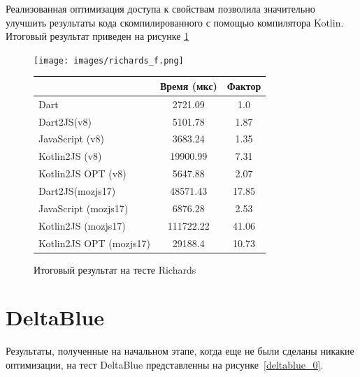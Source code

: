 Реализованная оптимизация доступа к свойствам позволила значительно улучшить результаты кода скомпилированного с помощью компилятора Kotlin. Итоговый результат приведен на рисунке \ref{richards_f}

\begin{figure}[ht!]
\centering
\begin{minipage}[t]{\linewidth}
\texttt{[image: images/richards\_f.png]}
\end{minipage}

\begin{minipage}[h]{\linewidth}
\centering
\begin{tabular}{|l|c|c|}
    \hline
    ~                       & Время (мкс) & Фактор \\ \hline
    Dart                    & 2721.09     & 1.0    \\ \hline
    Dart2JS(v8)             & 5101.78     & 1.87   \\ \hline
    JavaScript (v8)         & 3683.24     & 1.35   \\ \hline
    Kotlin2JS (v8)          & 19900.99    & 7.31   \\ \hline
    Kotlin2JS OPT (v8)      & 5647.88     & 2.07   \\ \hline
    Dart2JS(mozjs17)        & 48571.43    & 17.85  \\ \hline
    JavaScript (mozjs17)    & 6876.28     & 2.53   \\ \hline
    Kotlin2JS (mozjs17)     & 111722.22   & 41.06  \\ \hline
    Kotlin2JS OPT (mozjs17) & 29188.4     & 10.73  \\ \hline
\end{tabular}
\end{minipage}
\caption{Итоговый результат на тесте Richards}
\label{richards_f}
\end{figure}

\section{DeltaBlue}

Результаты, полученные на начальном этапе, когда еще не были сделаны никакие оптимизации, на тест DeltaBlue представленны на рисунке~\ref{deltablue_0}.

